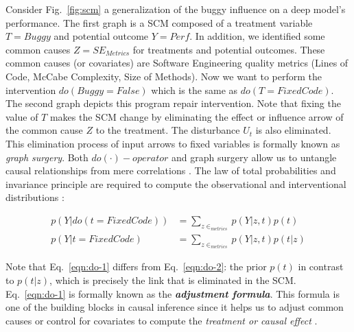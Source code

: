\begin{exmp} 
\label{exmp:scm}
Consider Fig.~\ref{fig:scm} a generalization of the buggy influence on a deep model's performance. The first graph is a SCM composed of a treatment variable $T=Buggy$ and potential outcome $Y=Perf$. In addition, we identified some common causes $Z=SE_{Metrics}$ for treatments and potential outcomes. These common causes (or covariates) are Software Engineering quality metrics (\eg Lines of Code, McCabe Complexity, Size of Methods). Now we want to perform the intervention $do(Buggy=False)$ which is the same as $do(T=FixedCode)$. The second graph depicts this program repair intervention. Note that fixing the value of $T$ makes the SCM change by eliminating the effect or influence arrow of the common cause $Z$ to the treatment. The disturbance $U_t$ is also eliminated. This elimination process of input arrows to fixed variables is formally known as \textit{graph surgery}. Both $do(\cdot)-operator$ and graph surgery allow us to untangle causal relationships from mere correlations \citep{Pearl2009Causality}. The law of total probabilities and invariance principle are required to compute the observational and interventional distributions \citep{Scholkopf2022}:
\end{exmp}

\begin{subequations}
\begin{align}
p(Y|do(t=FixedCode)) &=\sum_{z \in _{metrics}}p(Y|z,t)p(t)\label{eqn:do-1} \\
p(Y|t=FixedCode) &= \sum_{z \in _{metrics}}p(Y|z,t)p(t|z) \label{eqn:do-2} 
\end{align}
\label{eqn:do-all-lines}
\end{subequations}

Note that Eq.~\ref{eqn:do-1} differs from  Eq.~\ref{eqn:do-2}: the prior $p(t)$ in contrast to $p(t|z)$, which is precisely the link that is eliminated in the SCM. Eq.~\ref{eqn:do-1} is formally known as the \textbf{\textit{adjustment formula}}. This formula is one of the building blocks in causal inference since it helps us to adjust common causes or control for covariates to compute the \textit{treatment or causal effect} \citep{Pearl2009Causality,Pearl2016Causality}.


